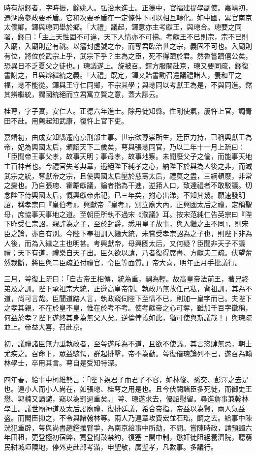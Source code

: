 \begin{pinyinscope}
時有胡鐸者，字時振，餘姚人。弘治末進士。正德中，官福建提學副使。嘉靖初，遷湖廣參政要矛盾。它和次要矛盾在一定條件下可以相互轉化。如中國，累官南京太僕卿。鐸與璁同舉於鄉。「大禮」議起，鐸意亦主考獻王，與璁合。璁要之同署，鐸曰：「主上天性固不可違，天下人情亦不可拂。考獻王不已則宗，宗不已則入廟，入廟則當有祧。以籓封虛號之帝，而奪君臨治世之宗，義固不可也。入廟則有位，將位於武宗上乎，武宗下乎？生為之臣，死不得躋於君。然魯嘗躋僖公矣，恐異日不乏夏父之徒也。」璁議遂上。旋被召。鐸方服闋赴京，璁又要同疏，鐸復書謝之，且與辨繼統之義。「大禮」既定，鐸又貽書勸召還議禮諸人，養和平之福，璁不能從。鐸與王守仁同鄉，不宗其學；與璁同以考獻王為是，不與同進。然其辨繼統，謂國統絕而立君寓立賢之意，蓋大謬云。

桂萼，字子實，安仁人。正德六年進士。除丹徒知縣。性剛使氣，屢忤上官，調青田不赴。用薦起知武康，復忤上官下吏。

嘉靖初，由成安知縣遷南京刑部主事。世宗欲尊崇所生，廷臣力持，已稱興獻王為帝，妃為興國太后，頒詔天下二歲矣，萼與張璁同官，乃以二年十一月上疏曰：「臣聞帝王事父孝，故事天明；事母孝，故事地察。未聞廢父子之倫，而能事天地主百神者也。今禮官失考典章，遏絕陛下純孝之心，納陛下於與為人後之非，而滅武宗之統，奪獻帝之宗，且使興國太后壓於慈壽太后，禮莫之盡，三綱頓廢，非常之變也。乃自張璁、霍韜獻議，論者指為干進，逆箝人口，致達禮者不敢駁議。切念陛下侍興國太后，慨興獻帝弗祀，已三年矣，拊心出涕，不知其幾。願速發明詔，稱孝宗曰『皇伯考』，興獻帝『皇考』，別立廟大內，正興國太后之禮，定稱聖母，庶協事天事地之道。至朝臣所執不過宋《濮議》耳。按宋范純仁告英宗曰『陛下昨受仁宗詔，親許為之子，至於封爵，悉用皇子故事，與入繼之主不同』，則宋臣之論，亦自有別。今陛下奉祖訓入繼大統，未嘗受孝宗詔為之子也，則陛下非為人後，而為入繼之主也明甚。考興獻帝，母興國太后，又何疑？臣聞非天子不議禮；天下有道，禮樂自天子出。臣久欲以請，乃者復得席書、方獻夫二疏。伏望奮然裁斷，將臣與二臣疏並付禮官，令臣等面質。」帝大喜，明年正月手批議行。

三月，萼復上疏曰：「自古帝王相傳，統為重，嗣為輕。故高皇帝法前王，著兄終弟及之訓。陛下承祖宗大統，正遵高皇帝制。執政乃無故任己私，背祖訓，其為不道，尚可言哉。臣聞道路人言，執政窺伺陛下至情不已，則加一皇字而已。夫陛下之孝其親，不在於皇不皇，惟在於考不考。使考獻帝之心可奪，雖加千百字徽稱，何益於孝？陛下遂終其身為無父人矣。逆倫悖義如此，猶可使與斯議哉！」與璁疏並上。帝益大喜，召赴京。

初，議禮諸臣無力詆執政者，至萼遂斥為不道，且欲不使議。其言恣肆無忌，朝士尤疾之。召命下，眾益駭愕，群起排擊，帝不為動。萼復偕璁論列不已，遂召為翰林學士，卒用其言。萼自是受知特深。

四年春，給事中柯維熊言：「陛下親君子而君子不容，如林俊、孫交、彭澤之去是也。遠小人而小人尚在，如張璁、桂萼之用是也。且今伏闕諸臣多死徙，而御史王懋、郭楠又謫譴，竊以為罰過重矣。」萼、璁遂求去，優詔慰留。尋進詹事兼翰林學士。議世廟神道及太后謁廟禮，復排廷議，希合帝指。帝益以為賢，兩人氣益盛。而閣臣抑之，不令與諸翰林等。兩人乃連章攻費宏並石珤，齮之去。給事中陳洸犯重辟，萼與尚書趙鑑攘臂爭，為南京給事中所劾，不問。嘗陳時政，請預蠲六年田租，更登極初宿弊，寬登聞鼓禁約，復塞上開中制，懲奸徒阻絕養濟院，聽窮民耕城垣陾地，停外吏赴部考滿，申聖敬，廣聖孝，凡數事。多議行。


\end{pinyinscope}
